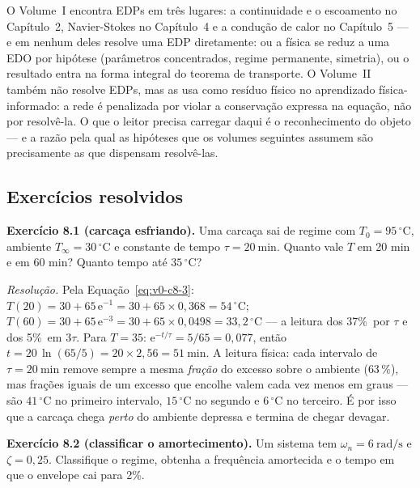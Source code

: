 \documentclass[12pt,a4paper]{article}
\numberwithin{equation}{section}
\numberwithin{table}{section}
\numberwithin{figure}{section}
\begin{document}
O Volume~I encontra EDPs em três lugares: a continuidade e o escoamento no
Capítulo~2, Navier-Stokes no Capítulo~4 e a condução de calor no
Capítulo~5 --- e em nenhum deles resolve uma EDP diretamente: ou a física
se reduz a uma EDO por hipótese (parâmetros concentrados, regime
permanente, simetria), ou o resultado entra na forma integral do teorema de
transporte. O Volume~II também não resolve EDPs, mas as usa como resíduo
físico no aprendizado física-informado: a rede é penalizada por violar a
conservação expressa na equação, não por resolvê-la. O que o leitor precisa
carregar daqui é o reconhecimento do objeto --- e a razão pela qual as
hipóteses que os volumes seguintes assumem são precisamente as que
dispensam resolvê-las.

\subsection{Exercícios resolvidos}

\textbf{Exercício 8.1 (carcaça esfriando).} Uma carcaça sai de regime com
$T_0 = 95\,^\circ\mathrm{C}$, ambiente $T_{\infty} = 30\,^\circ\mathrm{C}$
e constante de tempo $\tau = 20\ \mathrm{min}$. Quanto vale $T$ em 20 min
e em 60 min? Quanto tempo até $35\,^\circ\mathrm{C}$?

\emph{Resolução.} Pela Equação~\eqref{eq:v0-c8-3}:
$T(20) = 30 + 65\,\mathrm{e}^{-1} = 30 + 65 \times 0{,}368 =
54\,^\circ\mathrm{C}$; $T(60) = 30 + 65\,\mathrm{e}^{-3} =
30 + 65 \times 0{,}0498 = 33{,}2\,^\circ\mathrm{C}$ --- a leitura dos
37\%\ por $\tau$ e dos 5\%\ em $3\tau$. Para $T = 35$:
$\mathrm{e}^{-t/\tau} = 5/65 = 0{,}077$, então
$t = 20\,\ln(65/5) = 20 \times 2{,}56 = 51\ \mathrm{min}$. A leitura
física: cada intervalo de $\tau = 20\ \mathrm{min}$ remove sempre a mesma
\emph{fração} do excesso sobre o ambiente ($63\,\%$), mas frações iguais
de um excesso que encolhe valem cada vez menos em graus --- são
$41\,^\circ\mathrm{C}$ no primeiro intervalo, $15\,^\circ\mathrm{C}$ no
segundo e $6\,^\circ\mathrm{C}$ no terceiro. É por isso que a carcaça
chega \emph{perto} do ambiente depressa e termina de chegar devagar.

\textbf{Exercício 8.2 (classificar o amortecimento).} Um sistema tem
$\omega_n = 6\ \mathrm{rad/s}$ e $\zeta = 0{,}25$. Classifique o regime,
obtenha a frequência amortecida e o tempo em que o envelope cai para
2\%.
\end{document}
